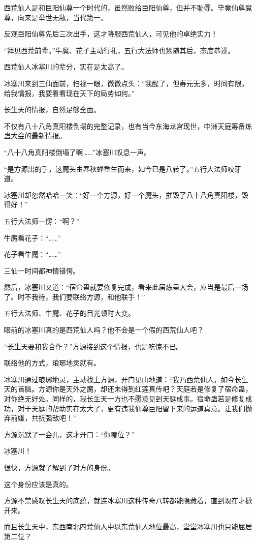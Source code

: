 \begin{this_body}
西荒仙人是和巨阳仙尊一个时代的，虽然败给巨阳仙尊，但并不耻辱。毕竟仙尊魔尊，向来是举世无敌，当代第一。

反观巨阳仙尊先后三次出手，这才降服西荒仙人，可见他的卓绝实力！

“拜见西荒前辈。”牛魔、花子主动行礼，五行大法师也紧随其后，态度恭谨。

西荒仙人冰塞川的辈分，实在是太高了。

冰塞川来到三仙面前，扫视一眼，微微点头：“我醒了，但寿元无多，时间有限。给我情报，我要看看现在天下的局势如何。”

长生天的情报，自然足够全面。

不仅有八十八角真阳楼倒塌的完整记录，也有当今东海龙宫现世，中洲天庭筹备炼蛊大会的最新情报。

“八十八角真阳楼倒塌了啊……”冰塞川叹息一声。

“是方源出的手，这魔头由春秋蝉重生而来，如今已是八转了。”五行大法师咬牙道。

冰塞川却忽然哈哈一笑：“好一个方源，好一个魔头，摧毁了八十八角真阳楼，毁得好！”

五行大法师一愣：“啊？”

牛魔看花子：“……”

花子看牛魔：“……”

三仙一时间都神情错愕。

然后，冰塞川又道：“宿命蛊就要修复完成，看来此届炼蛊大会，应当是最后一场了。时不我待，我们要联络方源，和他联手！”

五行大法师、牛魔、花子的目光顿时大变。

眼前的冰塞川真的是西荒仙人吗？他不会是一个假的西荒仙人吧？

“长生天要和我合作？”方源接到这个情报，也是吃惊不已。

联络他的方式，琅琊地灵就有。

冰塞川通过琅琊地灵，主动找上方源，开门见山地道：“我乃西荒仙人，如今长生天的首脑。方源你是天外之魔，却还未得到红莲真传吧？天庭若是修复了宿命蛊，对你绝无好处。同样的，我长生天一方也不愿意见到天庭成事。宿命蛊若是修复成功，对于天庭的帮助实在太大了，更有违我仙尊巨阳留下来的运道真意。让我们抛弃前嫌，共抗强敌吧！”

方源沉默了一会儿，这才开口：“你哪位？”

冰塞川！

很快，方源就了解到了对方的身份。

这个身份应该是真的。

方源不禁感叹长生天的底蕴，就连冰塞川这种传奇八转都能隐藏着，直到现在才掀开来。

而且长生天中，东西南北四荒仙人中以东荒仙人地位最高，堂堂冰塞川也只能屈居第二位？


\end{this_body}
